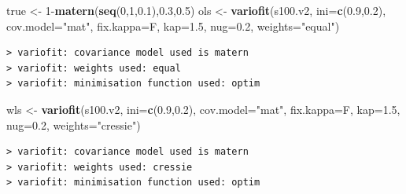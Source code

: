 \documentclass[b5paper,]{scrbook}
\makeatletter
\newenvironment{Shaded}{\begin{snugshade}}{\end{snugshade}}
\newcommand{\KeywordTok}[1]{\textcolor[rgb]{0.13,0.29,0.53}{\textbf{{#1}}}}
\newcommand{\DataTypeTok}[1]{\textcolor[rgb]{0.13,0.29,0.53}{{#1}}}
\newcommand{\DecValTok}[1]{\textcolor[rgb]{0.00,0.00,0.81}{{#1}}}
\newcommand{\FloatTok}[1]{\textcolor[rgb]{0.00,0.00,0.81}{{#1}}}
\newcommand{\StringTok}[1]{\textcolor[rgb]{0.31,0.60,0.02}{{#1}}}
\newcommand{\NormalTok}[1]{{#1}}
\theoremstyle{plain}
\theoremstyle{definition}
\numberwithin{equation}{section}
\newenvironment{kframe}{%
\medskip{}
\setlength{\fboxsep}{.8em}
 \def\at@end@of@kframe{}%
 \ifinner\ifhmode%
  \def\at@end@of@kframe{\end{minipage}}%
  \begin{minipage}{\columnwidth}%
 \fi\fi%
 \def\FrameCommand##1{\hskip\@totalleftmargin \hskip-\fboxsep
 \colorbox{shadecolor}{##1}\hskip-\fboxsep
     \hskip-\linewidth \hskip-\@totalleftmargin \hskip\columnwidth}%
 \MakeFramed {\advance\hsize-\width
   \@totalleftmargin\z@ \linewidth\hsize
   \@setminipage}}%
 {\par\unskip\endMakeFramed%
 \at@end@of@kframe}
\renewenvironment{Shaded}{\begin{kframe}}{\end{kframe}}
\makeatother
\begin{document}
\begin{Shaded}
\begin{Highlighting}[]
\NormalTok{true <-}\StringTok{ }\DecValTok{1}\NormalTok{-}\KeywordTok{matern}\NormalTok{(}\KeywordTok{seq}\NormalTok{(}\DecValTok{0}\NormalTok{,}\DecValTok{1}\NormalTok{,}\FloatTok{0.1}\NormalTok{),}\FloatTok{0.3}\NormalTok{,}\FloatTok{0.5}\NormalTok{)}
\NormalTok{ols <-}\StringTok{ }\KeywordTok{variofit}\NormalTok{(s100.v2, }\DataTypeTok{ini=}\KeywordTok{c}\NormalTok{(}\FloatTok{0.9}\NormalTok{,}\FloatTok{0.2}\NormalTok{), }\DataTypeTok{cov.model=}\StringTok{"mat"}\NormalTok{,}
                \DataTypeTok{fix.kappa=}\NormalTok{F, }\DataTypeTok{kap=}\FloatTok{1.5}\NormalTok{, }\DataTypeTok{nug=}\FloatTok{0.2}\NormalTok{, }\DataTypeTok{weights=}\StringTok{"equal"}\NormalTok{)}
\end{Highlighting}
\end{Shaded}

\begin{verbatim}
> variofit: covariance model used is matern 
> variofit: weights used: equal 
> variofit: minimisation function used: optim
\end{verbatim}

\begin{Shaded}
\begin{Highlighting}[]
\NormalTok{wls <-}\StringTok{ }\KeywordTok{variofit}\NormalTok{(s100.v2, }\DataTypeTok{ini=}\KeywordTok{c}\NormalTok{(}\FloatTok{0.9}\NormalTok{,}\FloatTok{0.2}\NormalTok{), }\DataTypeTok{cov.model=}\StringTok{"mat"}\NormalTok{,}
                \DataTypeTok{fix.kappa=}\NormalTok{F, }\DataTypeTok{kap=}\FloatTok{1.5}\NormalTok{, }\DataTypeTok{nug=}\FloatTok{0.2}\NormalTok{, }\DataTypeTok{weights=}\StringTok{"cressie"}\NormalTok{)}
\end{Highlighting}
\end{Shaded}

\begin{verbatim}
> variofit: covariance model used is matern 
> variofit: weights used: cressie 
> variofit: minimisation function used: optim
\end{verbatim}
\end{document}
